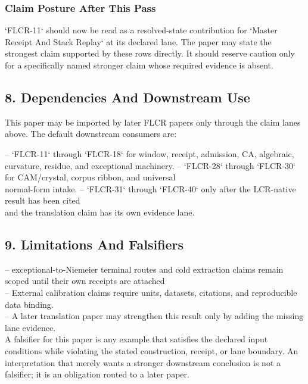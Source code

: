 \documentclass[11pt]{article}
\begin{document}
\subsubsection*{Claim Posture After This Pass}

`FLCR-11` should now be read as a resolved-state contribution for `Master Receipt And Stack Replay` at its declared lane. The paper may state the strongest claim supported by these rows directly. It should reserve caution only for a specifically named stronger claim whose required evidence is absent.

\subsection*{8. Dependencies And Downstream Use}

This paper may be imported by later FLCR papers only through the claim lanes
above. The default downstream consumers are:

\noindent{}-- `FLCR-11` through `FLCR-18` for window, receipt, admission, CA, algebraic,\\
  curvature, residue, and exceptional machinery.
\noindent{}-- `FLCR-28` through `FLCR-30` for CAM/crystal, corpus ribbon, and universal\\
  normal-form intake.
\noindent{}-- `FLCR-31` through `FLCR-40` only after the LCR-native result has been cited\\
  and the translation claim has its own evidence lane.

\subsection*{9. Limitations And Falsifiers}

\noindent{}-- exceptional-to-Niemeier terminal routes and cold extraction claims remain scoped until their own receipts are attached\\
\noindent{}-- External calibration claims require units, datasets, citations, and reproducible data binding.\\
\noindent{}-- A later translation paper may strengthen this result only by adding the missing lane evidence.\\

A falsifier for this paper is any example that satisfies the declared input
conditions while violating the stated construction, receipt, or lane boundary.
An interpretation that merely wants a stronger downstream conclusion is not a
falsifier; it is an obligation routed to a later paper.
\end{document}

